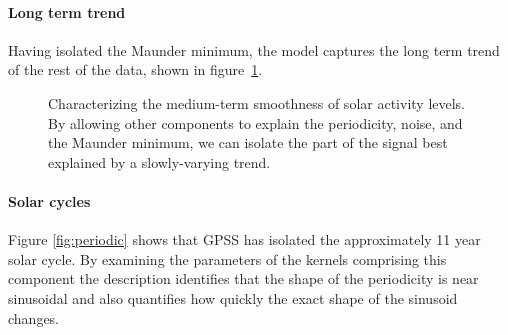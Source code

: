 \documentclass{article}
\begin{document}
\paragraph{Long term trend}

Having isolated the Maunder minimum, the model captures the long term trend of the rest of the data, shown in figure~\ref{fig:smooth}.

\begin{figure}[h!]
\centering
{}
\caption{Characterizing the medium-term smoothness of solar activity levels.  By allowing other components to explain the periodicity, noise, and the Maunder minimum, we can isolate the part of the signal best explained by a slowly-varying trend.}
\label{fig:smooth}
\end{figure}




\paragraph{Solar cycles}

Figure \ref{fig:periodic} shows that GPSS has isolated the approximately 11 year solar cycle.
By examining the parameters of the kernels comprising this component the description identifies that the shape of the periodicity is near sinusoidal  and also quantifies how quickly the exact shape of the sinusoid changes.
\end{document}

